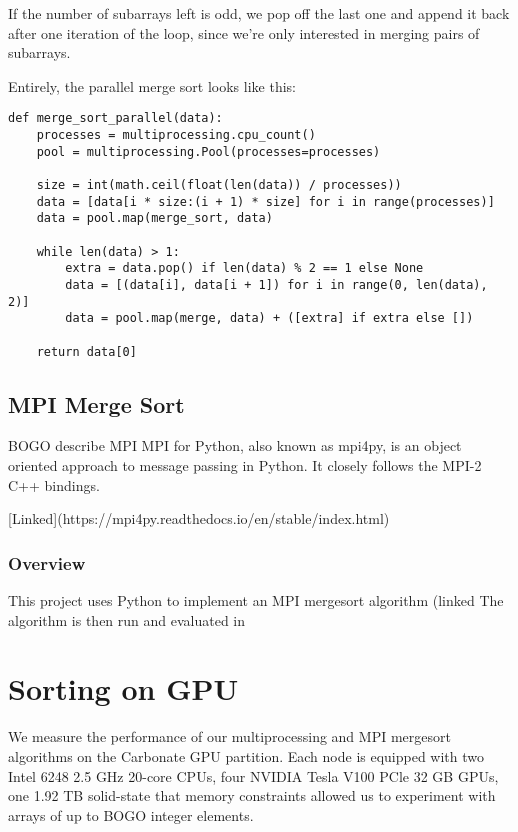 If the number of subarrays left is odd, we pop off the last one and append it back after one iteration of the loop,
since we're only interested in merging pairs of subarrays.

Entirely, the parallel merge sort looks like this:

\begin{verbatim}
def merge_sort_parallel(data):
    processes = multiprocessing.cpu_count()
    pool = multiprocessing.Pool(processes=processes)

    size = int(math.ceil(float(len(data)) / processes))
    data = [data[i * size:(i + 1) * size] for i in range(processes)]
    data = pool.map(merge_sort, data)

    while len(data) > 1:
        extra = data.pop() if len(data) % 2 == 1 else None
        data = [(data[i], data[i + 1]) for i in range(0, len(data), 2)]
        data = pool.map(merge, data) + ([extra] if extra else [])

    return data[0]
\end{verbatim}

\subsection{MPI Merge Sort}

BOGO describe MPI
MPI for Python, also known as mpi4py, is an object oriented approach to message passing in Python. It closely follows
the MPI-2 C++ bindings.

[Linked](https://mpi4py.readthedocs.io/en/stable/index.html)

\subsubsection{Overview}

This project uses Python to implement an MPI mergesort algorithm (linked
The algorithm is then run and evaluated in

\section{Sorting on GPU}

We measure the performance of our multiprocessing and MPI mergesort algorithms on the Carbonate GPU partition. Each node
is equipped with two Intel 6248 2.5 GHz 20-core CPUs, four NVIDIA Tesla V100 PCle 32 GB GPUs, one 1.92 TB solid-state
that memory constraints allowed us to experiment with arrays of up to BOGO integer elements.

